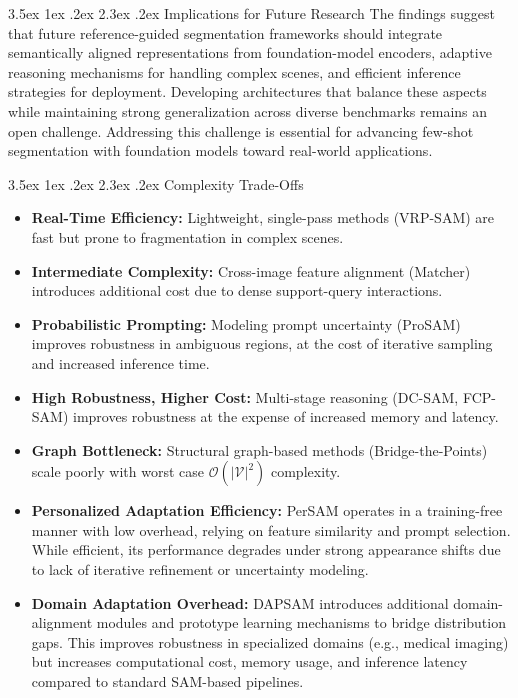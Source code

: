 \documentclass[journal,12pt,onecolumn,draftclsnofoot]{IEEEtran}
\makeatletter
\renewcommand{\section}{\@startsection{section}{1}{\z@}%
    {3.5ex \@plus 1ex \@minus .2ex}%
    {2.3ex \@plus.2ex}%
    {\normalfont\Large\bfseries}}
\makeatother
\begin{document}
\section{Implications for Future Research}
The findings suggest that future reference-guided segmentation frameworks should integrate semantically aligned representations from foundation-model encoders, adaptive reasoning mechanisms for handling complex scenes, and efficient inference strategies for deployment. Developing architectures that balance these aspects while maintaining strong generalization across diverse benchmarks remains an open challenge. Addressing this challenge is essential for advancing few-shot segmentation with foundation models toward real-world applications.

\section{Complexity Trade-Offs}

\begin{itemize}
    \item \textbf{Real-Time Efficiency:} Lightweight, single-pass methods (VRP-SAM) are fast but prone to fragmentation in complex scenes.
    
    \item \textbf{Intermediate Complexity:} Cross-image feature alignment (Matcher) introduces additional cost due to dense support-query interactions.
    
    \item \textbf{Probabilistic Prompting:} Modeling prompt uncertainty (ProSAM) improves robustness in ambiguous regions, at the cost of iterative sampling and increased inference time.
    
    \item \textbf{High Robustness, Higher Cost:} Multi-stage reasoning (DC-SAM, FCP-SAM) improves robustness at the expense of increased memory and latency.
    
    \item \textbf{Graph Bottleneck:} Structural graph-based methods (Bridge-the-Points) scale poorly with worst case $\mathcal{O}(|\mathcal{V}|^2)$ complexity.
    
    \item \textbf{Personalized Adaptation Efficiency:} PerSAM operates in a training-free manner with low overhead, relying on feature similarity and prompt selection. While efficient, its performance degrades under strong appearance shifts due to lack of iterative refinement or uncertainty modeling.
    
    \item \textbf{Domain Adaptation Overhead:} DAPSAM introduces additional domain-alignment modules and prototype learning mechanisms to bridge distribution gaps. This improves robustness in specialized domains (e.g., medical imaging) but increases computational cost, memory usage, and inference latency compared to standard SAM-based pipelines.
\end{itemize}
\end{document}
